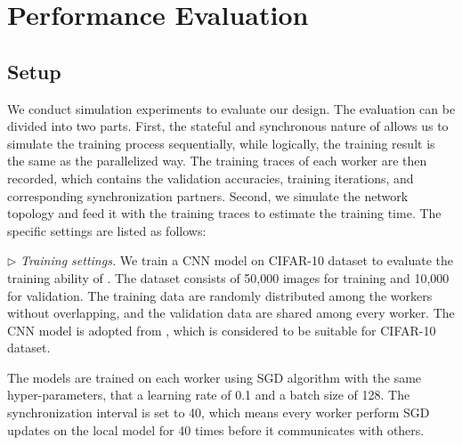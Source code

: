 \section{Performance Evaluation}


\subsection{Setup}

We conduct simulation experiments to evaluate our design. The evaluation can be divided into two parts. First, the stateful and synchronous nature of \sys allows us to simulate the training process sequentially, while logically, the training result is the same as the parallelized way. The training traces of each worker are then recorded, which contains the validation accuracies, training iterations, and corresponding synchronization partners. Second, we simulate the network topology and feed it with the training traces to estimate the training time. The specific settings are listed as follows:

$\triangleright$ \textit{Training settings.} We train a CNN model on CIFAR-10 dataset to evaluate the training ability of \sys. The dataset consists of  50,000 images for training and 10,000 for validation. The training data are randomly distributed among the workers without overlapping, and the validation data are shared among every worker. The CNN model is adopted from \cite{McMahan2017FL}, which is considered to be suitable for CIFAR-10 dataset. 

The models are trained on each worker using SGD algorithm with the same hyper-parameters, that a learning rate of 0.1 and a batch size of 128. The synchronization interval is set to 40, which means every worker perform SGD updates on the local model for 40 times before it communicates with others.

